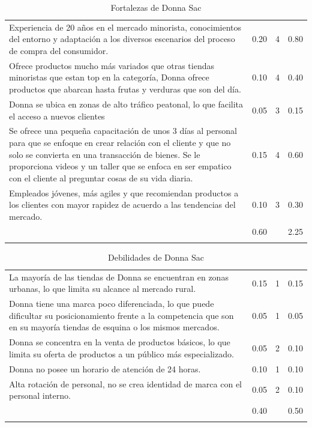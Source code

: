 \begin{longtable}{L{5cm} | C{2.5cm} | C{2.5cm} | C{2.5cm} }
	\hline
	 &   &  & \\
	\hline
	\endhead
	Experiencia de 20 años en el mercado minorista, conocimientos del entorno y adaptación a los diversos escenarios del proceso de compra del consumidor. & 0.20 & 4 &0.80\\
	\hline
	Ofrece productos mucho más variados que otras tiendas minoristas que estan top en la categoría, Donna ofrece productos que abarcan hasta frutas y verduras que son del día. & 0.10 & 4 & 0.40\\
	\hline
	Donna se ubica en zonas de alto tráfico peatonal, lo que facilita el acceso a nuevos clientes & 0.05 & 3 & 0.15\\
	\hline
	Se ofrece una pequeña capacitación de unos 3 días al personal para que se enfoque en crear relación con el cliente y que no solo se convierta en una transacción de bienes. Se le proporciona videos y un taller que se enfoca en ser empatico con el cliente al preguntar cosas de su vida diaria. & 0.15 & 4 & 0.60\\
	\hline
	Empleados jóvenes, más agiles y que recomiendan productos a los clientes con mayor rapidez de acuerdo a las tendencias del mercado. & 0.10 & 3 & 0.30\\
	\hline
	& 0.60 &  & 2.25\\
	\hline
	\caption{Fortalezas de Donna Sac}
	\label{tab:widgets}
\end{longtable}


\begin{longtable}{L{5cm} | C{2.5cm} | C{2.5cm} | C{2.5cm} }
	\hline
	 &   &  & \\
	\hline
	\endhead
	La mayoría de las tiendas de Donna se encuentran en zonas urbanas, lo que limita su alcance al mercado rural. & 0.15 & 1 &0.15\\
	\hline
	Donna tiene una marca poco diferenciada, lo que puede dificultar su posicionamiento frente a la competencia que son en su mayoría tiendas de esquina o los mismos mercados. & 0.05 & 1 & 0.05\\
	\hline
	Donna se concentra en la venta de productos básicos, lo que limita su oferta de productos a un público más especializado. & 0.05 & 2 & 0.10\\
	\hline
	Donna no posee un horario de atención de 24 horas. & 0.10 & 1 & 0.10\\
	\hline
	Alta rotación de personal, no se crea identidad de marca con el personal interno. & 0.05 & 2 & 0.10\\
	\hline
	& 0.40 &  & 0.50\\
	\hline
	\caption{Debilidades de Donna Sac}
	\label{tab:widgets}
\end{longtable}


